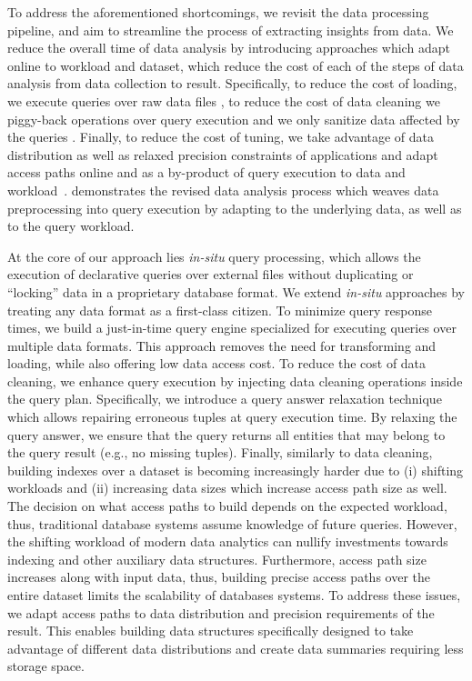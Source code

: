To address the aforementioned shortcomings, we revisit the data processing
pipeline, and aim to streamline the process of extracting insights from data. 
We reduce 
the overall time of data analysis by introducing approaches which adapt
online to workload and dataset, which reduce the cost of each of the 
steps of data analysis from data collection to result.
Specifically, to reduce the cost of loading, we execute queries over 
raw data files \cite{Alagiannis2012a, 
Karpathiotakis2016,Karpathiotakis2015,Karpathiotakis2014}, to reduce 
the cost of data cleaning we piggy-back operations over query 
execution and we only sanitize data affected by the queries 
\cite{query_driven_cleaning}. Finally, to reduce the cost of tuning, 
we take advantage of data distribution as well as relaxed precision 
constraints of applications and adapt access paths online and as a
by-product of query execution to data and 
workload~\cite{Olma2017a,Olma2019}. 
 demonstrates the revised data 
analysis process which weaves data preprocessing into query execution 
by adapting to the underlying data, as well as to the query workload.

At the core of our approach lies \textit{in-situ} query processing, 
which allows the execution of declarative queries over external files 
without duplicating or ``locking'' data in a proprietary database 
format. 
We extend \textit{in-situ} approaches 
\cite{Alagiannis2012a,Idreos2011} by treating any data format as a 
first-class citizen. To minimize query response times, we build a 
just-in-time query engine specialized for executing queries over 
multiple data formats. This approach removes the need for 
transforming and loading, while also offering low data access cost.
%
To reduce the cost of data cleaning, we enhance query execution by 
injecting data cleaning operations inside the query plan. 
Specifically, we introduce a query answer relaxation technique which 
allows repairing erroneous tuples at query execution time. By 
relaxing the query answer, we ensure that the query returns all entities 
that may belong to the query result (e.g., no missing tuples).
%
Finally, similarly to data cleaning, building indexes over a 
dataset is becoming increasingly harder due to (i) shifting workloads 
and (ii) increasing data sizes which increase access path size as 
well.
The decision on what access paths to build depends on the expected 
workload, thus, traditional database systems assume knowledge of future 
queries. However, the shifting workload of modern data analytics can 
nullify investments towards indexing and other auxiliary data 
structures. Furthermore, access path size increases along with input 
data, thus, building precise access paths over the entire dataset 
limits the scalability of databases systems.
To address these issues, we adapt access paths to data 
distribution and precision requirements of the result. This enables 
building data structures specifically designed to take advantage of 
different data distributions and create data summaries requiring less 
storage space.

